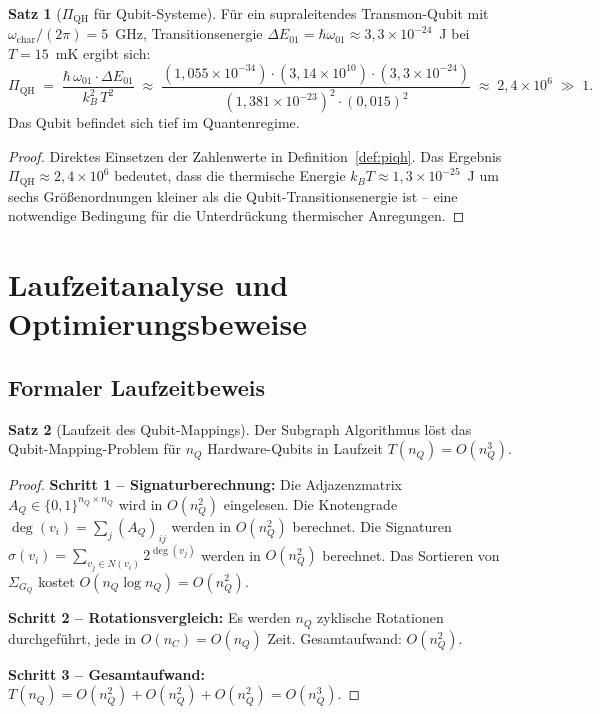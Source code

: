 ﻿\documentclass[a4paper,12pt]{article}
\theoremstyle{definition}
\newtheorem{satz}{Satz}
\begin{document}
\begin{satz}[$\Pi_\mathrm{QH}$ für Qubit-Systeme]
\label{satz:piqh}
Für ein supraleitendes Transmon-Qubit mit $\omega_\mathrm{char}/(2\pi) = 5$~GHz,
Transitionsenergie $\Delta E_{01} = \hbar\omega_{01} \approx 3{,}3\times10^{-24}$~J
bei $T = 15$~mK ergibt sich:
\[
  \Pi_\mathrm{QH} \;=\;
  \frac{\hbar\,\omega_{01}\cdot\Delta E_{01}}{k_B^2\,T^2}
  \;\approx\;
  \frac{(1{,}055\times10^{-34})\cdot(3{,}14\times10^{10})
  \cdot(3{,}3\times10^{-24})}{(1{,}381\times10^{-23})^2\cdot(0{,}015)^2}
  \;\approx\; 2{,}4\times10^{6} \;\gg\; 1.
\]
Das Qubit befindet sich tief im Quantenregime.
\end{satz}

\begin{proof}
Direktes Einsetzen der Zahlenwerte in Definition~\ref{def:piqh}. Das Ergebnis
$\Pi_\mathrm{QH} \approx 2{,}4 \times 10^6$ bedeutet, dass die thermische
Energie $k_B T \approx 1{,}3\times10^{-25}$~J um sechs Größenordnungen kleiner
als die Qubit-Transitionsenergie ist -- eine notwendige Bedingung für die
Unterdrückung thermischer Anregungen.
\end{proof}

\section{Laufzeitanalyse und Optimierungsbeweise}
\label{sec:analyse}

\subsection{Formaler Laufzeitbeweis}

\begin{satz}[Laufzeit des Qubit-Mappings]
\label{satz:laufzeit}
Der Subgraph Algorithmus löst das Qubit-Mapping-Problem für $n_Q$ Hardware-Qubits
in Laufzeit $T(n_Q) = O(n_Q^3)$.
\end{satz}

\begin{proof}
\textbf{Schritt 1 -- Signaturberechnung:} Die Adjazenzmatrix $A_Q \in
\{0,1\}^{n_Q\times n_Q}$ wird in $O(n_Q^2)$ eingelesen. Die Knotengrade
$\deg(v_i) = \sum_j (A_Q)_{ij}$ werden in $O(n_Q^2)$ berechnet. Die Signaturen
$\sigma(v_i) = \sum_{v_j \in N(v_i)} 2^{\deg(v_j)}$ werden in $O(n_Q^2)$
berechnet. Das Sortieren von $\Sigma_{G_Q}$ kostet $O(n_Q \log n_Q) = O(n_Q^2)$.

\textbf{Schritt 2 -- Rotationsvergleich:} Es werden $n_Q$ zyklische Rotationen
durchgeführt, jede in $O(n_C) = O(n_Q)$ Zeit. Gesamtaufwand: $O(n_Q^2)$.

\textbf{Schritt 3 -- Gesamtaufwand:}
$T(n_Q) = O(n_Q^2) + O(n_Q^2) + O(n_Q^2) = O(n_Q^3)$.
\end{proof}
\end{document}
